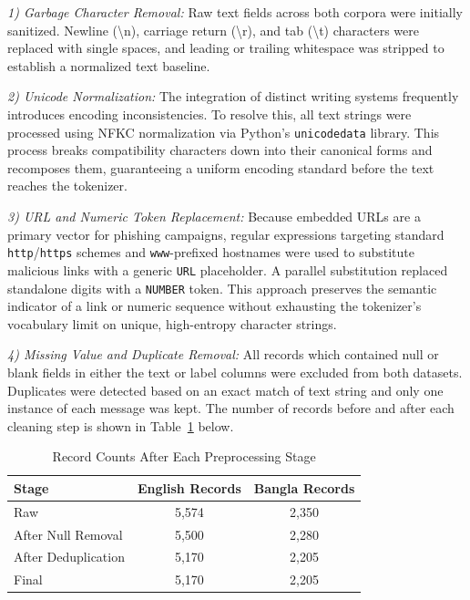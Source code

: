 \documentclass[journal]{IEEEtran}
\begin{document}
\textit{1) Garbage Character Removal:} Raw text fields across both corpora were initially sanitized. Newline (\textbackslash n), carriage return (\textbackslash r), and tab (\textbackslash t) characters were replaced with single spaces, and leading or trailing whitespace was stripped to establish a normalized text baseline.

\textit{2) Unicode Normalization:} The integration of distinct writing systems frequently introduces encoding inconsistencies. To resolve this, all text strings were processed using NFKC normalization via Python's \texttt{unicodedata} library. This process breaks compatibility characters down into their canonical forms and recomposes them, guaranteeing a uniform encoding standard before the text reaches the tokenizer.

\textit{3) URL and Numeric Token Replacement:} Because embedded URLs are a primary vector for phishing campaigns, regular expressions targeting standard \texttt{http}/\texttt{https} schemes and \texttt{www}-prefixed hostnames were used to substitute malicious links with a generic \texttt{URL} placeholder. A parallel substitution replaced standalone digits with a \texttt{NUMBER} token. This approach preserves the semantic indicator of a link or numeric sequence without exhausting the tokenizer's vocabulary limit on unique, high-entropy character strings.

\textit{4) Missing Value and Duplicate Removal:} All records which contained
null or blank fields in either the text or label columns were excluded
from both datasets. Duplicates were detected based on an exact match of
text string and only one instance of each message was kept. The number
of records before and after each cleaning step is shown in Table~\ref{tab:dataset_prep}
below.

\begin{table}[htbp]
\caption{Record Counts After Each Preprocessing Stage}
\label{tab:dataset_prep}
\centering
\begin{tabular}{lcc}
\toprule
\textbf{Stage} & \textbf{English Records} & \textbf{Bangla Records} \\
\midrule
Raw & 5,574 & 2,350 \\
After Null Removal & 5,500 & 2,280 \\
After Deduplication & 5,170 & 2,205 \\
Final & 5,170 & 2,205 \\
\bottomrule
\end{tabular}
\end{table}
\end{document}
